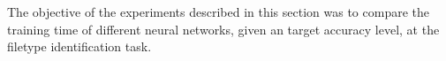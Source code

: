 The objective of the experiments described in this section 
was to compare the training time of different neural networks, given an target accuracy level, at the filetype identification task.
